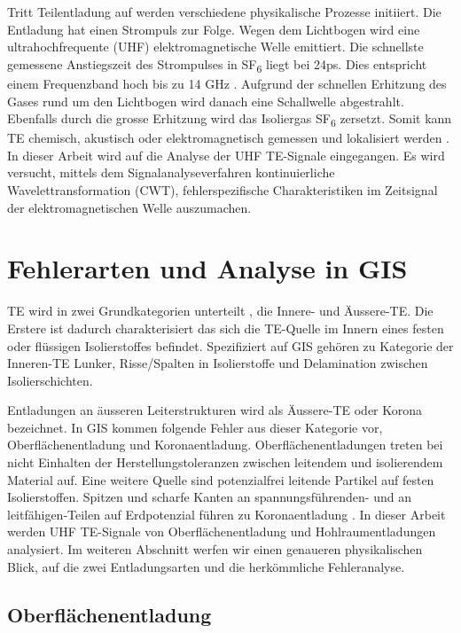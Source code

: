 \begin{refsection}
Tritt Teilentladung auf werden verschiedene  physikalische Prozesse initiiert. 
Die Entladung hat einen Strompuls zur Folge.
Wegen dem Lichtbogen wird eine ultrahochfrequente (UHF) elektromagnetische Welle emittiert.
Die schnellste gemessene Anstiegszeit des Strompulses in SF\textsubscript{6} liegt bei 24ps.
Dies entspricht einem Frequenzband hoch bis zu 14 GHz \cite{skript:Judd24ps} . 
Aufgrund der schnellen Erhitzung des Gases rund um den Lichtbogen wird danach eine Schallwelle abgestrahlt. 
Ebenfalls durch die grosse Erhitzung wird das Isoliergas SF\textsubscript{6} zersetzt. 
Somit kann TE chemisch, akustisch oder elektromagnetisch gemessen und lokalisiert werden \cite{skript:StatusReviewPDMeasurement}.
In dieser Arbeit wird auf die Analyse der UHF TE-Signale eingegangen.
Es wird versucht, mittels dem Signalanalyseverfahren kontinuierliche Wavelettransformation (CWT), fehlerspezifische Charakteristiken im Zeitsignal der elektromagnetischen Welle auszumachen.

\section{Fehlerarten und Analyse in GIS}

TE wird in zwei Grundkategorien unterteilt \cite{buch:Kuchler}, die Innere- und Äussere-TE. 
Die Erstere ist dadurch charakterisiert das sich die TE-Quelle im Innern eines festen oder flüssigen Isolierstoffes befindet. 
Spezifiziert auf GIS gehören zu Kategorie der Inneren-TE Lunker, Risse/Spalten in Isolierstoffe und Delamination zwischen Isolierschichten.
 
Entladungen an äusseren Leiterstrukturen wird als Äussere-TE oder Korona bezeichnet. 
In GIS kommen folgende Fehler aus dieser Kategorie vor, Oberflächenentladung und Koronaentladung. 
Oberflächenentladungen treten bei nicht Einhalten der Herstellungstoleranzen zwischen leitendem und isolierendem Material auf.
Eine weitere Quelle sind potenzialfrei leitende Partikel auf festen Isolierstoffen.
Spitzen und scharfe Kanten an spannungsführenden- und an leitfähigen-Teilen auf Erdpotenzial führen zu Koronaentladung \cite{buch:Kuchler, skript:AeussreTE, skript:InnereTE}. 
In dieser Arbeit werden UHF TE-Signale von Oberflächenentladung und Hohlraumentladungen analysiert. 
Im weiteren Abschnitt werfen wir einen genaueren physikalischen Blick, auf die zwei Entladungsarten und die herkömmliche Fehleranalyse.

\subsection{Oberflächenentladung}


\end{refsection}

